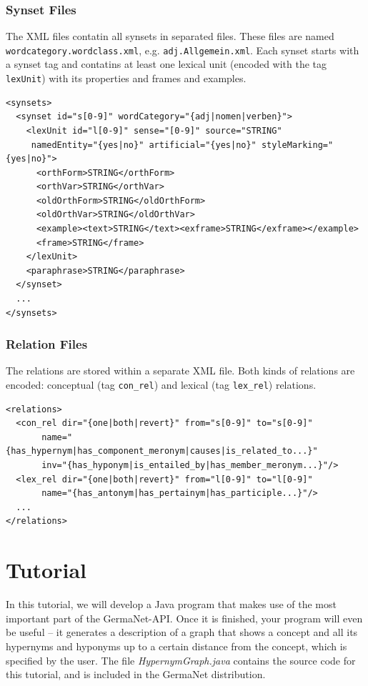 \documentclass[12pt,a4paper,english,utf8]{report}
\begin{document}
\subsection{Synset Files}
The XML files contatin all synsets in separated files. These files are named \texttt{wordcategory.wordclass.xml}, e.g. \texttt{adj.Allgemein.xml}. Each synset starts with a synset tag and contatins at least one lexical unit (encoded with the tag \texttt{lexUnit}) with its properties and frames and examples.

\begin{lstlisting}
<synsets>
  <synset id="s[0-9]" wordCategory="{adj|nomen|verben}">
    <lexUnit id="l[0-9]" sense="[0-9]" source="STRING"
     namedEntity="{yes|no}" artificial="{yes|no}" styleMarking="{yes|no}">
      <orthForm>STRING</orthForm>
      <orthVar>STRING</orthVar>
      <oldOrthForm>STRING</oldOrthForm>
      <oldOrthVar>STRING</oldOrthVar>
      <example><text>STRING</text><exframe>STRING</exframe></example>
      <frame>STRING</frame>
    </lexUnit>
    <paraphrase>STRING</paraphrase>
  </synset>
  ...
</synsets>
\end{lstlisting}



\subsection{Relation Files}
The relations are stored within a separate XML file. Both kinds of relations are encoded: conceptual (tag \texttt{con\_rel}) and lexical (tag \texttt{lex\_rel}) relations.

\begin{lstlisting}
<relations>
  <con_rel dir="{one|both|revert}" from="s[0-9]" to="s[0-9]"
       name="{has_hypernym|has_component_meronym|causes|is_related_to...}"
       inv="{has_hyponym|is_entailed_by|has_member_meronym...}"/>
  <lex_rel dir="{one|both|revert}" from="l[0-9]" to="l[0-9]"
       name="{has_antonym|has_pertainym|has_participle...}"/>
  ...
</relations>
\end{lstlisting}





\chapter{Tutorial}
In this tutorial, we will develop a Java program that makes use of the most important part of the GermaNet-API. Once it is finished, your program will even be useful – it generates a description of a graph that shows a concept and all its hypernyms and hyponyms up to a certain distance from the concept, which is specified by the user. The file \emph{HypernymGraph.java} contains the source code for this tutorial, and is included in the GermaNet distribution.
\end{document}
